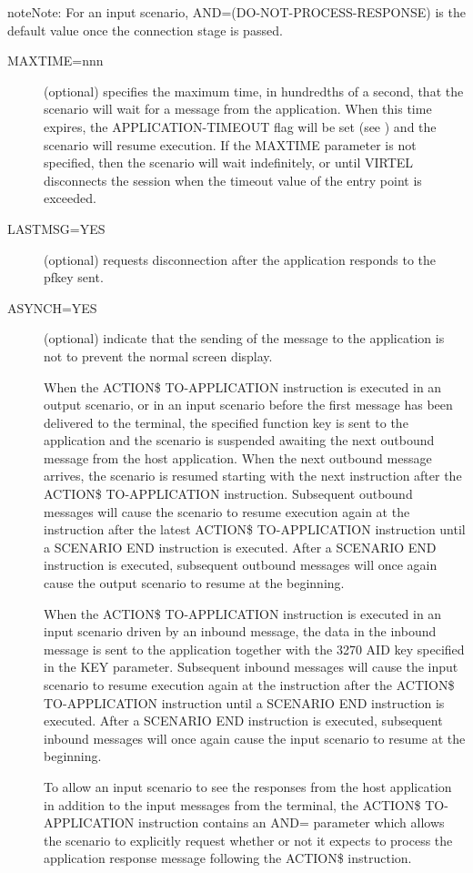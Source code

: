 \documentclass[letterpaper,10pt,english]{sphinxmanual}
\begin{document}
\begin{sphinxadmonition}{note}{Note:}
For an input scenario, AND=(DO-NOT-PROCESS-RESPONSE) is the default value once the connection stage is passed.
\end{sphinxadmonition}
\begin{description}
\item[{MAXTIME=nnn}] \leavevmode
(optional) specifies the maximum time, in hundredths of a second, that the scenario will wait for a message from the application. When this time expires, the APPLICATION-TIMEOUT flag will be set (see {\hyperref[\detokenize{User_Guide:v457ug-if}]{}}) and the scenario will resume execution. If the MAXTIME parameter is not specified, then the scenario will wait indefinitely, or until VIRTEL disconnects the session when the timeout value of the entry point is exceeded.

\item[{LASTMSG=YES}] \leavevmode
(optional) requests disconnection after the application responds to the pfkey sent.

\item[{ASYNCH=YES}] \leavevmode
(optional) indicate that the sending of the message to the application is not to prevent the normal screen display.

When the ACTION\$ TO-APPLICATION instruction is executed in an output scenario, or in an input scenario before the first message has been delivered to the terminal, the specified function key is sent to the application and the scenario is suspended awaiting the next outbound message from the host application. When the next outbound message arrives, the scenario is resumed starting with the next instruction after the ACTION\$ TO-APPLICATION instruction. Subsequent outbound messages will cause the scenario to resume execution again at the instruction after the latest ACTION\$ TO-APPLICATION instruction until a SCENARIO END instruction is executed. After a SCENARIO END instruction is executed, subsequent outbound messages will once again cause the output scenario to resume at the beginning.

When the ACTION\$ TO-APPLICATION instruction is executed in an input scenario driven by an inbound message, the data in the inbound message is sent to the application together with the 3270 AID key specified in the KEY parameter. Subsequent inbound messages will cause the input scenario to resume execution again at the instruction after the ACTION\$ TO-APPLICATION instruction until a SCENARIO END instruction is executed. After a SCENARIO END instruction is executed, subsequent inbound messages will once again cause the input scenario to resume at the beginning.

To allow an input scenario to see the responses from the host application in addition to the input messages from the terminal, the ACTION\$ TO-APPLICATION instruction contains an AND= parameter which allows the scenario to explicitly request whether or not it expects to process the application response message following the ACTION\$ instruction.

\end{description}
\end{document}
